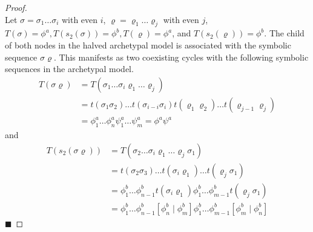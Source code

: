 \begin{proof} \phantom{x} \\
	Let $\sigma = \sigma_1 \dots \sigma_i$ with even $i$, $\varrho = \varrho_1 \dots \varrho_j$ with even $j$, $T(\sigma) = \phi^a, T(s_2(\sigma)) = \phi^b, T(\varrho) = \phi^a$, and $T(s_2(\varrho)) = \phi^b$.
	The child of both nodes in the halved archetypal model is associated with the symbolic sequence $\sigma\varrho$.
	This manifests as two coexisting cycles with the following symbolic sequences in the archetypal model.
	\begin{align*}
		T(\sigma\varrho) & = T(\sigma_1 \dots \sigma_i \varrho_1 \dots \varrho_j)                                                    \\
		                 & = t(\sigma_1\sigma_2) \dots t(\sigma_{i-i}\sigma_i) t(\varrho_1\varrho_2) \dots t(\varrho_{j-1}\varrho_j) \\
		                 & = \phi^a_1 \dots \phi^a_n \psi^a_1 \dots \psi^a_m = \phi^a\psi^a
	\end{align*}
	and
	\begin{align*}
		T(s_2(\sigma\varrho)) & = T(\sigma_2 \dots \sigma_i \varrho_1 \dots \varrho_j \sigma_1)                                                                   \\
		                      & = t(\sigma_2\sigma_3) \dots t(\sigma_i\varrho_1) \dots t(\varrho_j\sigma_1)                                                       \\
		                      & = \phi^b_1 \dots \phi^b_{n-1} t(\sigma_i\varrho_1) \phi^b_1 \dots \phi^b_{m-1} t(\varrho_j\sigma_1)                               \\
		                      & = \phi^b_1 \dots \phi^b_{n-1} \left[\phi^b_n \mid \phi^b_m\right] \phi^b_1 \dots \phi^b_{m-1} \left[\phi^b_m \mid \phi^b_n\right]
	\end{align*}
	\hfill $\blacksquare$
\end{proof}
